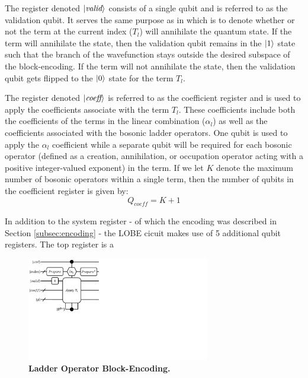 The register denoted $\ket{\textit{valid}}$ consists of a single qubit and is referred to as the validation qubit.
It serves the same purpose as in \cite{liu2024efficient} which is to denote whether or not the term at the current index ($T_l$) will annihilate the quantum state.
If the term will annihilate the state, then the validation qubit remains in the $\ket{1}$ state such that the branch of the wavefunction stays outside the desired subspace of the block-encoding.
If the term will not annihilate the state, then the validation qubit gets flipped to the $\ket{0}$ state for the term $T_l$.

The register denoted $\ket{\textit{coeff}}$ is referred to as the coefficient register and is used to apply the coefficients associate with the term $T_l$. 
These coefficients include both the coefficients of the terms in the linear combination ($\alpha_l$) as well as the coefficients associated with the bosonic ladder operators.
One qubit is used to apply the $\alpha_l$ coefficient while a separate qubit will be required for each bosonic operator (defined as a creation, annihilation, or occupation operator acting with a positive integer-valued exponent) in the term.
If we let $K$ denote the maximum number of bosonic operators within a single term, then the number of qubits in the coefficient register is given by:
\begin{equation}
    Q_{\textit{coeff}} = K + 1
\end{equation} 

In addition to the system register - of which the encoding was described in Section \ref{subsec:encoding} - the LOBE cicuit makes use of 5 additional qubit registers.
The top register is a 

\begin{figure}
    \centering
    \includegraphics[width=8cm]{figures/lobe-block-encoding.pdf}
    \caption{\textbf{Ladder Operator Block-Encoding.}
    }
    \label{fig:lobe}
\end{figure}

